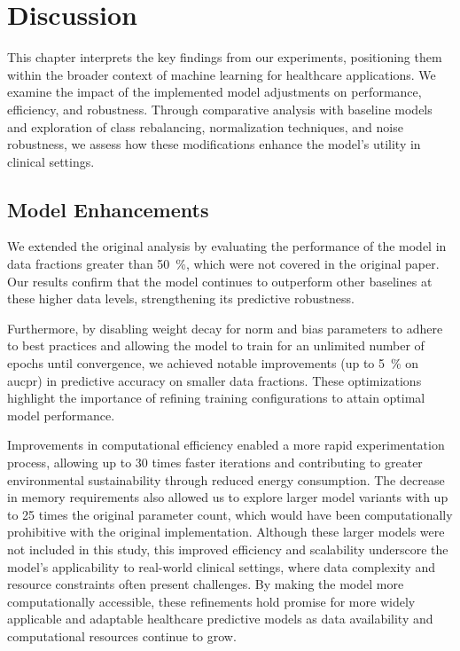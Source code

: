 \chapter{Discussion}
\label{ch:discussion}

This chapter interprets the key findings from our experiments, positioning them within the broader context of machine learning for healthcare applications. We examine the impact of the implemented model adjustments on performance, efficiency, and robustness. Through comparative analysis with baseline models and exploration of class rebalancing, normalization techniques, and noise robustness, we assess how these modifications enhance the model's utility in clinical settings.


\section{Model Enhancements}

We extended the original analysis by evaluating the performance of the model in data fractions greater than \qty{50}{\percent}, which were not covered in the original paper. Our results confirm that the  model continues to outperform other baselines at these higher data levels, strengthening its predictive robustness.

Furthermore, by disabling weight decay for norm and bias parameters to adhere to best practices and allowing the model to train for an unlimited number of epochs until convergence, we achieved notable improvements (up to \qty{5}{\percent} on \gls{aucpr}) in predictive accuracy on smaller data fractions. These optimizations highlight the importance of refining training configurations to attain optimal model performance.

Improvements in computational efficiency enabled a more rapid experimentation process, allowing up to 30 times faster iterations and contributing to greater environmental sustainability through reduced energy consumption. The decrease in memory requirements also allowed us to explore larger model variants with up to 25 times the original parameter count, which would have been computationally prohibitive with the original implementation.
 Although these larger models were not included in this study, this improved efficiency and scalability underscore the model's applicability to real-world clinical settings, where data complexity and resource constraints often present challenges. By making the model more computationally accessible, these refinements hold promise for more widely applicable and adaptable healthcare predictive models as data availability and computational resources continue to grow.

